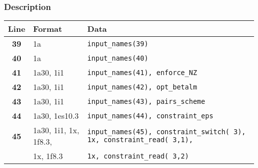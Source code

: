 \documentclass[a4paper,11pt]{article}
\begin{document}
\subsubsection*{Description}
\begin{center}
\small
\begin{tabular}{|c|l|l|}
\hline
Line & Format & Data \\
\hline
 \textbf{39}   & 1a            & \tt input\_names(39)                  \\
 \textbf{40}   & 1a            & \tt input\_names(40)                  \\
 \textbf{41}   & 1a30, 1i1     & \tt input\_names(41), enforce\_NZ     \\
 \textbf{42}   & 1a30, 1i1     & \tt input\_names(42), opt\_betalm     \\
 \textbf{43}   & 1a30, 1i1     & \tt input\_names(43), pairs\_scheme   \\
 \textbf{44}   & 1a30, 1es10.3 & \tt input\_names(44), constraint\_eps \\
 \textbf{45}   & 1a30, 1i1, 1x, 1f8.3, & \tt input\_names(45), constraint\_switch( 3), 1x, constraint\_read( 3,1), \\
               &            1x, 1f8.3 & \tt                                           1x, constraint\_read( 3,2)  \\

\end{tabular}
\end{center}
\end{document}
